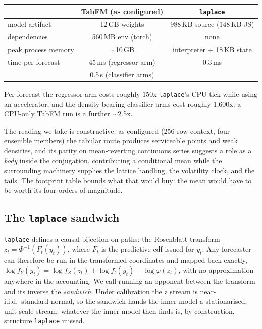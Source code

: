 \documentclass[article]{jss}
\providecommand{\pkg}[1]{\textbf{#1}}
\providecommand{\code}[1]{\texttt{#1}}
\begin{document}
\begin{center}
\begin{tabular}{lcc}
\hline
 & \pkg{TabFM} (as configured) & \code{laplace} \\
\hline
model artifact      & 12\,GB weights            & 988\,KB source (148\,KB JS) \\
dependencies        & 560\,MB env (torch)       & none \\
peak process memory & ${\sim}$10\,GB            & interpreter + 18\,KB state \\
time per forecast   & 45\,ms (regressor arm)    & 0.3\,ms \\
                    & 0.5\,s (classifier arms)  & \\
\hline
\end{tabular}
\end{center}

Per forecast the regressor arm costs roughly 150x \code{laplace}'s CPU
tick while using an accelerator, and the density-bearing classifier arms
cost roughly 1,600x; a CPU-only TabFM run is a further ${\sim}$2.5x.

The reading we take is constructive: as configured (256-row context, four
ensemble members) the tabular route produces serviceable points and weak
densities, and its parity on mean-reverting continuous series suggests a
role as a \emph{body} inside the conjugation, contributing a conditional
mean while the surrounding machinery supplies the lattice handling, the
volatility clock, and the tails. The footprint table bounds what that
would buy: the mean would have to be worth its four orders of magnitude.

\subsection{The \code{laplace} sandwich} \label{sec:sandwich}

\code{laplace} defines a causal bijection on paths: the Rosenblatt
transform $z_t = \Phi^{-1}(F_t(y_t))$, where $F_t$ is the predictive cdf
issued for $y_t$. Any forecaster can therefore be run in the transformed
coordinates and mapped back exactly,
$\log f_Y(y_t) = \log f_Z(z_t) + \log f_t(y_t) - \log\varphi(z_t)$,
with no approximation anywhere in the accounting. We call running an
opponent between the transform and its inverse the \emph{sandwich}. Under
calibration the z stream is near-i.i.d.\ standard normal, so the sandwich
hands the inner model a stationarised, unit-scale stream; whatever the
inner model then finds is, by construction, structure \code{laplace}
missed.
\end{document}
